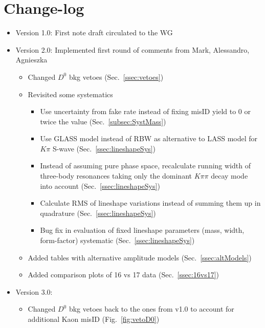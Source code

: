 
\section*{Change-log}
\label{sec:change}


\begin{itemize}
	\item Version 1.0: First note draft circulated to the WG
	
	\item Version 2.0: Implemented first round of comments from Mark, Alessandro, Agnieszka
	\begin{itemize}
		\item Changed $D^0$ bkg vetoes (Sec.~\ref{ssec:vetoes}) 
		\item Revisited some systematics
			\begin{itemize}
				\item Use uncertainty from fake rate instead of fixing misID yield to 0 or twice the value (Sec.~\ref{subsec:SystMass})
				\item Use GLASS model instead of RBW as alternative to LASS model for $K\pi$ S-wave (Sec.~\ref{ssec:lineshapeSys}) 
				\item Instead of assuming pure phase space, 
					recalculate running width of three-body resonances taking only the dominant $K\pi\pi$ decay mode into account (Sec.~\ref{ssec:lineshapeSys}) 
				\item Calculate RMS of lineshape variations instead of summing them up in quadrature (Sec.~\ref{ssec:lineshapeSys}) 
				\item Bug fix in evaluation of fixed lineshape parameters (mass, width, form-factor) systematic (Sec.~\ref{ssec:lineshapeSys}) 
			\end{itemize}
		\item Added tables with alternative amplitude models (Sec.~\ref{ssec:altModels}) 
		\item Added comparison plots of 16 vs 17 data (Sec.~\ref{ssec:16vs17}) 
	\end{itemize}
	
	\item Version 3.0: 
	\begin{itemize}
	
		\item Changed $D^0$ bkg vetoes back to the ones from v1.0 to account for additional Kaon misID (Fig.~\ref{fig:vetoD0}) 		


\end{itemize}
\end{itemize}
